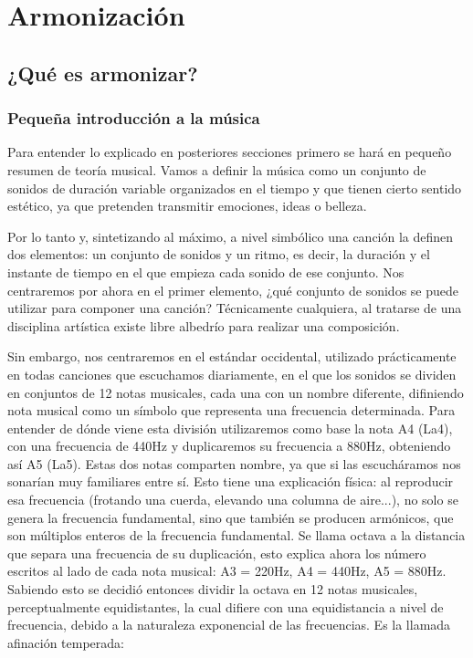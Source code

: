 \chapter{Armonización}
\label{cap:armonizacion}



\section{¿Qué es armonizar?}
    \subsection{Pequeña introducción a la música}\label{sec:arm:armonia}

        Para entender lo explicado en posteriores secciones primero se hará en pequeño resumen de teoría musical. Vamos a definir la música como un conjunto de sonidos de duración variable organizados en el tiempo y que tienen cierto sentido estético, ya que pretenden transmitir emociones, ideas o belleza.

        Por lo tanto y, sintetizando al máximo, a nivel simbólico una canción la definen dos elementos: un conjunto de sonidos y un ritmo, es decir, la duración y el instante de tiempo en el que empieza cada sonido de ese conjunto. Nos centraremos por ahora en el primer elemento, ¿qué conjunto de sonidos se puede utilizar para componer una canción?
        Técnicamente cualquiera, al tratarse de una disciplina artística existe libre albedrío para realizar una composición. 

        \label{arm:notas_musicales}
        Sin embargo, nos centraremos en el estándar occidental, utilizado prácticamente en todas canciones que escuchamos diariamente, en el que los sonidos se dividen en conjuntos de 12 notas musicales, cada una con un nombre diferente, difiniendo nota musical como un símbolo que representa una frecuencia determinada. Para entender de dónde viene esta división utilizaremos como base la nota A4 (La4), con una frecuencia de 440Hz y duplicaremos su frecuencia a 880Hz, obteniendo así A5 (La5). Estas dos notas comparten nombre, ya que si las escucháramos nos sonarían muy familiares entre sí. Esto tiene una explicación física: al reproducir esa frecuencia (frotando una cuerda, elevando una columna de aire...), no solo se genera la frecuencia fundamental, sino que también se producen armónicos, que son múltiplos enteros de la frecuencia fundamental. Se llama octava a la distancia que separa una frecuencia de su duplicación, esto explica ahora los número escritos al lado de cada nota musical: A3 = 220Hz, A4 = 440Hz, A5 = 880Hz. Sabiendo esto se decidió entonces dividir la octava en 12 notas musicales, perceptualmente equidistantes, la cual difiere con una equidistancia a nivel de frecuencia, debido a la naturaleza exponencial de las frecuencias. Es la llamada afinación temperada:

